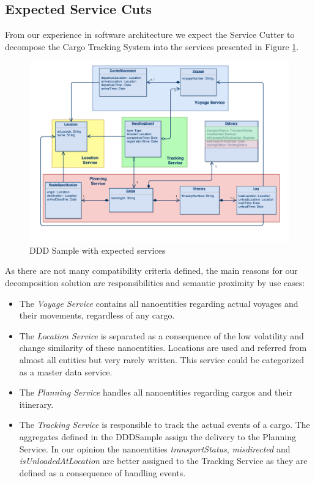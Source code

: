 \subsection{Expected Service Cuts}

From our experience in software architecture we expect the Service Cutter to decompose the Cargo Tracking System into the services presented in Figure \ref{fig:dddSampleServices}.

\begin{figure}[H]
	\includegraphics[scale=0.5]{diagrams/ddd_sample_services.pdf}
	\caption{DDD Sample with expected services}
	\label{fig:dddSampleServices}
\end{figure}

As there are not many compatibility criteria defined, the main reasons for our decomposition solution are responsibilities and semantic proximity by use cases:

\begin{itemize}
	\item The \textit{Voyage Service} contains all nanoentities regarding actual voyages and their movements, regardless of any cargo. 
	\item The \textit{Location Service} is separated as a consequence of the low volatility and change similarity of these nanoentities. Locations are used and referred from almost all entities but very rarely written. This service could be categorized as a master data service.
	\item The \textit{Planning Service} handles all nanoentities regarding cargos and their itinerary. 
	\item The \textit{Tracking Service} is responsible to track the actual events of a cargo. The aggregates defined in the DDDSample assign the delivery to the Planning Service. In our opinion the nanoentities \textit{transportStatus}, \textit{misdirected} and \textit{isUnloadedAtLocation} are better assigned to the Tracking Service as they are defined as a consequence of handling events.
\end{itemize}

